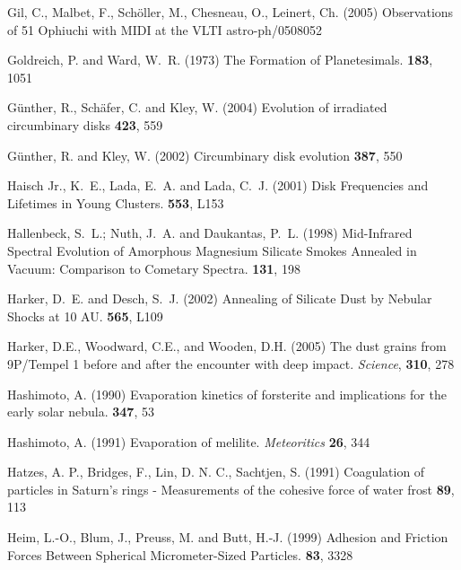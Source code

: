 \begin{literature}
\item
Gil, C., Malbet, F., Sch\"oller, M., Chesneau, O., Leinert, Ch. (2005)
Observations of 51 Ophiuchi with MIDI at the VLTI astro-ph/0508052

\item
Goldreich, P. and Ward, W.~R. (1973) The Formation of Planetesimals. \apj
\textbf{183}, 1051

\item
G\"unther, R., Sch\"afer, C. and Kley, W. (2004)  Evolution of irradiated
circumbinary disks \aap \textbf{423}, 559

\item
G\"unther, R. and Kley, W. (2002) Circumbinary disk evolution \aap
\textbf{387}, 550

\item
Haisch Jr., K.~E.,  Lada, E.~A. and Lada, C.~J. (2001) Disk Frequencies and
Lifetimes in Young Clusters. \apj \textbf{553}, L153

\item
Hallenbeck, S.~L.; Nuth, J.~A. and Daukantas, P.~L. (1998) Mid-Infrared
Spectral Evolution of Amorphous Magnesium Silicate Smokes Annealed in
Vacuum: Comparison to Cometary Spectra. \ica \textbf{131}, 198

\item
Harker, D.~E. and Desch, S.~J. (2002) Annealing of Silicate Dust by Nebular 
Shocks at 10 AU. \apj \textbf{565}, L109

\item Harker, D.E., Woodward, C.E., and Wooden, D.H. (2005) The dust grains
  from 9P/Tempel 1 before and after the encounter with deep
  impact. \textit{Science\/}, \textbf{310}, 278

\item
Hashimoto, A. (1990) Evaporation kinetics of forsterite and implications for
the early solar nebula. \nat \textbf{347}, 53

\item
Hashimoto, A. (1991) Evaporation of melilite. \textit{Meteoritics\/}
\textbf{26}, 344

\item
Hatzes, A. P., Bridges, F., Lin, D. N. C., Sachtjen, S. (1991)
Coagulation of particles in Saturn's rings - Measurements of the cohesive
force of water frost \ica \textbf{89}, 113

\item
Heim, L.-O., Blum, J., Preuss, M. and Butt, H.-J. (1999) Adhesion and
Friction Forces Between Spherical Micrometer-Sized Particles. \prl
\textbf{83}, 3328


\end{literature}
